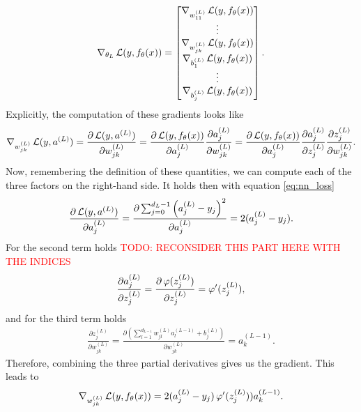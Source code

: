 \begin{align*}
\nabla_{\theta_{L}} \operatorname{\mathcal{L}}(y, f_{\theta}(x)) = \left[\begin{matrix}
\nabla_{w^{(L)}_{11}} \operatorname{\mathcal{L}}(y, f_{\theta}(x))\\
\vdots\\
\nabla_{w^{(L)}_{jk}} \operatorname{\mathcal{L}}(y, f_{\theta}(x))\\
\nabla_{b^{(L)}_{1}} \operatorname{\mathcal{L}}(y, f_{\theta}(x))\\
\vdots\\
\nabla_{b^{(L)}_{j}} \operatorname{\mathcal{L}}(y, f_{\theta}(x))
\end{matrix} \right].
\end{align*}
Explicitly, the computation of these gradients looks like
\begin{align*}
\nabla_{w^{(L)}_{jk}} \operatorname{\mathcal{L}}(y, a^{(L)}) = \frac{\partial \operatorname{\mathcal{L}}(y, a^{(L)})}{\partial w^{(L)}_{jk}} = \frac{\partial \operatorname{\mathcal{L}}(y, f_{\theta}(x))}{\partial a_{j}^{(L)}} \frac{\partial a_{j}^{(L)}}{\partial w^{(L)}_{jk}} = \frac{\partial \operatorname{\mathcal{L}}(y, f_{\theta}(x))}{\partial a_{j}^{(L)}} \frac{\partial a_{j}^{(L)}}{\partial z_{j}^{(L)}} \frac{\partial z_{j}^{(L)}}{\partial w^{(L)}_{jk}}.
\end{align*}
Now, remembering the definition of these quantities, we can compute each of the three factors on the right-hand side. It holds then with equation \eqref{eq:nn_loss}
\begin{align}\label{eq:part1}
\frac{\partial \operatorname{\mathcal{L}}(y, a^{(L)})}{\partial a_{j}^{(L)}} = \frac{\partial \sum_{j=0}^{d_L-1} \left(a_{j}^{(L)} - y_j \right)^2}{\partial a_{j}^{(L)}} = 2(a_{j}^{(L)} - y_j).
\end{align}
For the second term holds \textcolor{red}{TODO: RECONSIDER THIS PART HERE WITH THE INDICES}
\begin{align}\label{eq:part2}
\frac{\partial a_{j}^{(L)}}{\partial z_{j}^{(L)}} = \frac{\partial \operatorname{\varphi}(z_{j}^{(L)})}{\partial z_{j}^{(L)}} = \operatorname{\varphi}^{\prime} (z_{j}^{(L)}),
\end{align}
and for the third term holds
\begin{align}\label{eq:part3}
\frac{\partial z_{j}^{(L)}}{\partial w^{(L)}_{jk}} = \frac{\partial \left(\sum_{l=1}^{d_{L-1}} w^{(L)}_{jl} a_{l}^{(L-1)} + b_j^{(L)}\right)}{\partial w^{(L)}_{jk}} = a_{k}^{(L-1)}.
\end{align}
Therefore, combining the three partial derivatives gives us the gradient. This leads to
\begin{align*}
\nabla_{w^{(L)}_{jk}} \operatorname{\mathcal{L}}(y, f_{\theta}(x)) = 2(a_{j}^{(L)} - y_j) \operatorname{\varphi}^{\prime} (z_{j}^{(L)})) a_{k}^{(L-1)}.
\end{align*}
